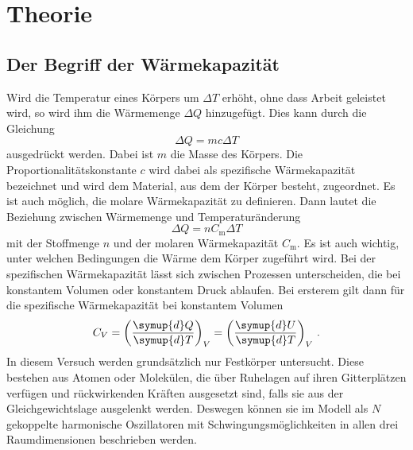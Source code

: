 \section{Theorie}
\label{sec:Theorie}
\subsection{Der Begriff der Wärmekapazität}
Wird die Temperatur eines Körpers um $\Delta T$ erhöht, ohne dass Arbeit geleistet
wird, so wird ihm die Wärmemenge $\Delta Q$ hinzugefügt. Dies kann durch die Gleichung
\begin{equation}
  \Delta Q = m c \Delta T
  \label{eqn:specificheat}
\end{equation}
ausgedrückt werden. Dabei ist $m$ die Masse des Körpers. Die Proportionalitätskonstante
$c$ wird dabei als spezifische Wärmekapazität bezeichnet und wird dem Material,
aus dem der Körper besteht, zugeordnet. \newline
Es ist auch möglich, die molare Wärmekapazität zu definieren. Dann lautet die
Beziehung zwischen Wärmemenge und Temperaturänderung
\begin{equation}
  \Delta Q = n C_\text{m} \Delta T
  \label{eqn:molarheat}
\end{equation}
mit der Stoffmenge $n$ und der molaren Wärmekapazität $C_\text{m}$. \newline
Es ist auch wichtig, unter welchen Bedingungen die Wärme dem Körper zugeführt wird.
Bei der spezifischen Wärmekapazität lässt sich zwischen Prozessen unterscheiden,
die bei konstantem Volumen oder konstantem Druck ablaufen. Bei ersterem gilt
dann für die spezifische Wärmekapazität bei konstantem Volumen
\begin{equation}
  C_V = \left(\frac{\symup{d}Q}{\symup{d}T}\right)_V = \left(\frac{\symup{d}U}{\symup{d}T}\right)_V\,.
  \label{eqn:cv}
\end{equation}
In diesem Versuch werden grundsätzlich nur Festkörper untersucht. Diese bestehen
aus Atomen oder Molekülen, die über Ruhelagen auf ihren Gitterplätzen verfügen und
rückwirkenden Kräften ausgesetzt sind, falls sie aus der Gleichgewichtslage ausgelenkt
werden. Deswegen können sie im Modell als $N$ gekoppelte harmonische Oszillatoren
mit Schwingungsmöglichkeiten in allen drei Raumdimensionen beschrieben werden.
